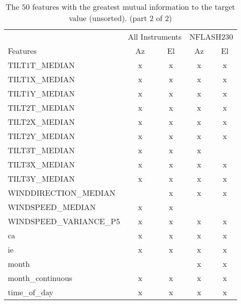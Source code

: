 \begin{table}
    \centering
    \caption{The $50$ features with the greatest mutual information to the target value (unsorted). (part 2 of 2)}
    \begin{tabular}{lcccc}
        \toprule
        & \multicolumn{2}{c}{All Instruments} & \multicolumn{2}{c}{NFLASH230}\\
        \cmidrule(lr){2-3} \cmidrule(lr){4-5}
        Features & Az & El & Az & El \\  \hline
        TILT1T\_MEDIAN       &      x &      x &      x &      x    \\ \hline
        TILT1X\_MEDIAN       &      x &      x &      x &      x    \\ \hline
        TILT1Y\_MEDIAN       &      x &      x &      x &      x    \\ \hline
        TILT2T\_MEDIAN       &      x &      x &      x &      x    \\ \hline
        TILT2X\_MEDIAN       &      x &      x &      x &      x    \\ \hline
        TILT2Y\_MEDIAN       &      x &      x &      x &      x    \\ \hline
        TILT3T\_MEDIAN       &      x &      x &      x &          \\ \hline
        TILT3X\_MEDIAN       &      x &      x &      x &      x   \\ \hline
        TILT3Y\_MEDIAN       &      x &      x &      x &      x   \\ \hline
        WINDDIRECTION\_MEDIAN &        &      x &      x &      x  \\ \hline
        WINDSPEED\_MEDIAN     &      x &      x &        &         \\ \hline
        WINDSPEED\_VARIANCE\_P5 &      x &      x &      x &      x  \\ \hline
        ca                   &      x &      x &      x &      x    \\ \hline
        ie                   &      x &      x &      x &      x    \\ \hline
        month                &        &        &      x &      x    \\ \hline
        month\_continuous    &      x &      x &      x &      x    \\ \hline
        time\_of\_day        &      x &      x &      x &      x    \\ \hline
    \end{tabular}        
    \label{tab:exp2_top50_features2}
\end{table}


